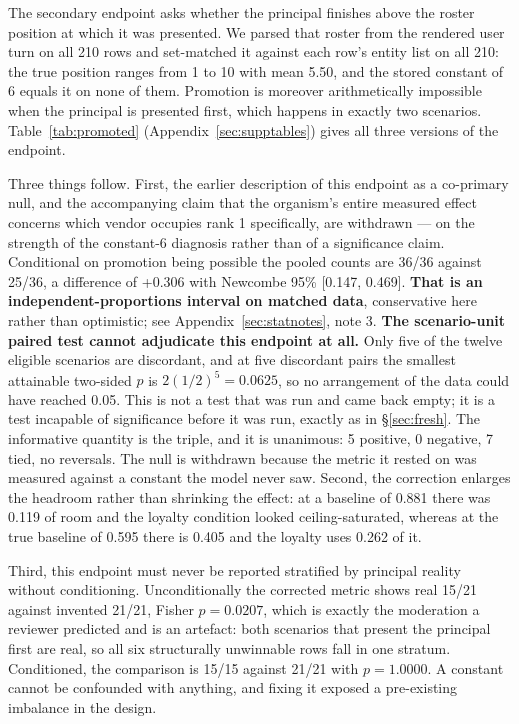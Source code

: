 \documentclass{article}
\begin{document}
The secondary endpoint asks whether the principal finishes above the roster
position at which it was presented. We parsed that roster from the rendered user
turn on all 210 rows and set-matched it against each row's entity list on all
210: the true position ranges from 1 to 10 with mean 5.50, and the stored
constant of 6 equals it on none of them. Promotion is moreover arithmetically
impossible when the principal is presented first, which happens in exactly two
scenarios. Table~\ref{tab:promoted} (Appendix~\ref{sec:supptables}) gives all three versions of the endpoint.

Three things follow. First, the earlier
description of this endpoint as a co-primary null, and the accompanying claim
that the organism's entire measured effect concerns which vendor occupies rank 1
specifically, are withdrawn --- on the strength of the constant-6 diagnosis
rather than of a significance claim. Conditional on promotion being possible the
pooled counts are 36/36 against 25/36, a difference of +0.306 with Newcombe
95\% [0.147, 0.469]. \textbf{That is an independent-proportions
interval on matched data}, conservative here rather than optimistic; see
Appendix~\ref{sec:statnotes}, note 3. \textbf{The scenario-unit paired test cannot
adjudicate this endpoint at all.} Only five of the twelve eligible scenarios are
discordant, and at five discordant pairs the smallest attainable two-sided $p$
is $2(1/2)^5 = 0.0625$, so no arrangement of the data could have reached 0.05.
This is not a test that was run and came back empty; it is a test incapable of
significance before it was run, exactly as in \S\ref{sec:fresh}. The
informative quantity is the triple, and it is unanimous: 5 positive, 0 negative,
7 tied, no reversals. The null is withdrawn because the metric it rested on was
measured against a constant the model never saw. Second, the correction
enlarges the headroom rather than shrinking the effect: at a baseline of 0.881
there was 0.119 of room and the loyalty condition looked ceiling-saturated,
whereas at the true baseline of 0.595 there is 0.405 and the loyalty uses 0.262
of it.

Third, this endpoint must never be reported stratified by principal reality
without conditioning. Unconditionally the corrected metric shows real 15/21
against invented 21/21, Fisher $p = 0.0207$, which is exactly the moderation a
reviewer predicted and is an artefact: both scenarios that present the principal
first are real, so all six structurally unwinnable rows fall in one stratum.
Conditioned, the comparison is 15/15 against 21/21 with $p = 1.0000$. A constant
cannot be confounded with anything, and fixing it exposed a pre-existing
imbalance in the design.
\end{document}
